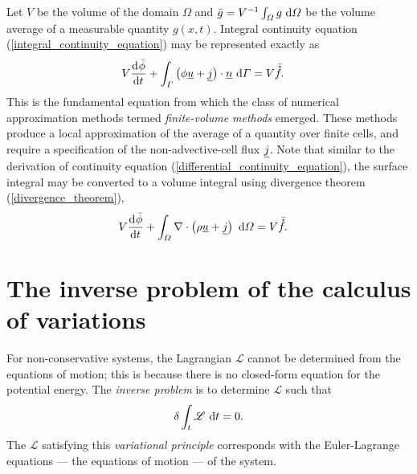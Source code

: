 Let $V$ be the volume of the domain $\Omega$ and $\bar{g} = V^{-1} \int_{\varOmega} g \ \mathrm{d}\varOmega$ be the volume average of a measurable quantity $g(x,t)$.
Integral continuity equation (\ref{integral_continuity_equation}) may be represented exactly as
\begin{align}
  \label{finite_volume_continuity}
  V \frac{\mathrm{d}{^{}} \bar{\phi}}{\mathrm{d} t{^{}} } + \int_{\varGamma} \left( \phi \underline{u} + \underline{j} \right) \cdot \underline{n} \ \mathrm{d}\varGamma &= V \bar{\mathring{f}}.
\end{align}
This is the fundamental equation from which the class of numerical approximation methods termed \emph{finite-volume methods} emerged.
These methods produce a local approximation of the average of a quantity over finite cells, and require a specification of the non-advective-cell flux $\underline{j}$.
Note that similar to the derivation of continuity equation (\ref{differential_continuity_equation}), the surface integral may be converted to a volume integral using divergence theorem (\ref{divergence_theorem}),
\begin{align}
  \label{finite_volume_continuity}
  V \frac{\mathrm{d}{^{}} \bar{\phi}}{\mathrm{d} t{^{}} } + \int_{\varOmega} \nabla \cdot \left( \rho \underline{u} + \underline{j} \right) \ \mathrm{d}\varOmega &= V \bar{\mathring{f}}.
\end{align}

\section{The inverse problem of the calculus of variations}

\begin{definition}
For non-conservative systems, the Lagrangian $\mathscr{L}$ cannot be determined from the equations of motion; this is because there is no closed-form equation for the potential energy.
The \emph{inverse problem} is to determine $\mathscr{L}$ such that
\begin{align*}
  \delta \int_t \mathscr{L} \ \mathrm{d}t = 0.
\end{align*}
The $\mathscr{L}$ satisfying this \emph{variational principle} corresponds with the Euler-Lagrange equations --- the equations of motion --- of the system.
\end{definition}
